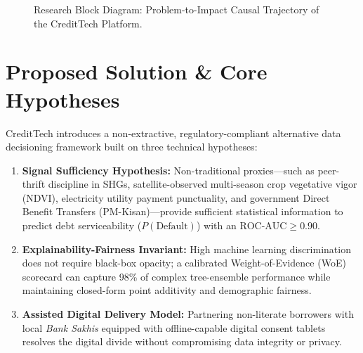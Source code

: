 \documentclass[11pt,a4paper,oneside]{report}
\begin{document}
\begin{figure}[H]
\caption{Research Block Diagram: Problem-to-Impact Causal Trajectory of the CreditTech Platform.}
\label{fig:problem_solution_chain}
\end{figure}

\section{Proposed Solution \& Core Hypotheses}
CreditTech introduces a non-extractive, regulatory-compliant alternative data decisioning framework built on three technical hypotheses:
\begin{enumerate}
  \item \textbf{Signal Sufficiency Hypothesis:} Non-traditional proxies---such as peer-thrift discipline in SHGs, satellite-observed multi-season crop vegetative vigor (NDVI), electricity utility payment punctuality, and government Direct Benefit Transfers (PM-Kisan)---provide sufficient statistical information to predict debt serviceability ($P(\text{Default})$) with an $\text{ROC-AUC} \ge 0.90$.
  \item \textbf{Explainability-Fairness Invariant:} High machine learning discrimination does not require black-box opacity; a calibrated Weight-of-Evidence (WoE) scorecard can capture 98\% of complex tree-ensemble performance while maintaining closed-form point additivity and demographic fairness.
  \item \textbf{Assisted Digital Delivery Model:} Partnering non-literate borrowers with local \textit{Bank Sakhis} equipped with offline-capable digital consent tablets resolves the digital divide without compromising data integrity or privacy.
\end{enumerate}




\end{document}
